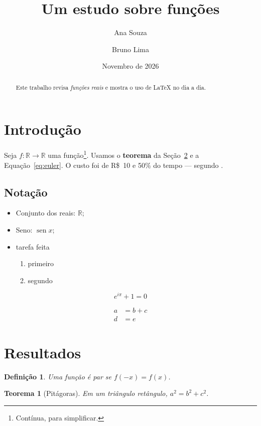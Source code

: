 \documentclass[12pt]{article}
\title{Um estudo sobre funções}
\author{Ana Souza \and Bruno Lima}
\date{Novembro de 2026}
\newcommand{\R}{\mathbb{R}}
\newcommand{\destaque}[1]{\textbf{#1}}
\DeclareMathOperator{\sen}{sen}
\newtheorem{teorema}{Teorema}
\newtheorem{definicao}{Definição}
\begin{document}
\maketitle

\begin{abstract}
Este trabalho revisa \emph{funções reais} e mostra o uso de \LaTeX{} no dia a dia.
\end{abstract}

\section{Introdução}\label{sec:intro}
Seja $f\colon \R \to \R$ uma função\footnote{Contínua, para simplificar.}. Usamos o
\destaque{teorema} da Seção~\ref{sec:teo} e a Equação~\eqref{eq:euler}. %
O custo foi de R\$~10 e 50\% do tempo --- segundo \cite{knuth}.

\subsection{Notação}
\begin{itemize}
  \item Conjunto dos reais: $\R$;
  \item Seno: $\sen x$;
  \item[$\boxtimes$] tarefa feita
  \begin{enumerate}
    \item primeiro
    \item segundo
  \end{enumerate}
\end{itemize}

\begin{equation}\label{eq:euler}
  e^{i\pi} + 1 = 0
\end{equation}

\begin{align}
  a &= b + c \label{eq:a}\\
  d &= e \nonumber
\end{align}

\section{Resultados}\label{sec:teo}

\begin{definicao}
Uma função é \textit{par} se $f(-x) = f(x)$.
\end{definicao}

\begin{teorema}[Pitágoras]
Em um triângulo retângulo, $a^2 = b^2 + c^2$.
\end{teorema}
\end{document}
